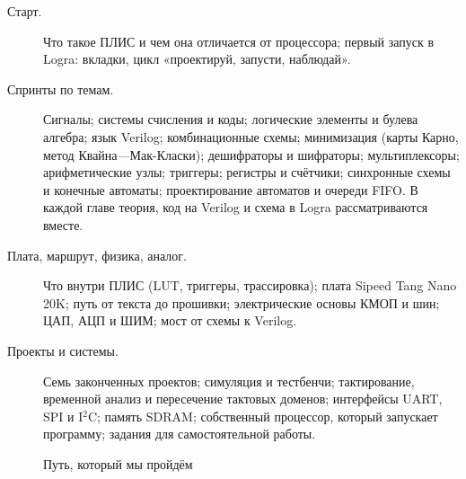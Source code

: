 \begin{description}
  \item[Старт.] Что такое ПЛИС и чем она отличается от процессора; первый
    запуск в Logra: вкладки, цикл «проектируй, запусти, наблюдай».
  \item[Спринты по темам.] Сигналы; системы счисления и коды; логические
    элементы и булева алгебра; язык Verilog; комбинационные схемы;
    минимизация (карты Карно, метод Квайна---Мак-Класки); дешифраторы и
    шифраторы; мультиплексоры; арифметические узлы; триггеры; регистры и
    счётчики; синхронные схемы и конечные автоматы; проектирование автоматов и
    очереди FIFO. В каждой главе теория, код на Verilog и схема в Logra
    рассматриваются вместе.
  \item[Плата, маршрут, физика, аналог.] Что внутри ПЛИС (LUT, триггеры,
    трассировка); плата Sipeed Tang Nano 20K; путь от текста до прошивки;
    электрические основы КМОП и шин; ЦАП, АЦП и ШИМ; мост от схемы к Verilog.
  \item[Проекты и системы.] Семь законченных проектов; симуляция и
    тестбенчи; тактирование, временной анализ и пересечение тактовых доменов;
    интерфейсы UART, SPI и I$^2$C; память SDRAM; собственный процессор,
    который запускает программу; задания для самостоятельной работы.
\end{description}

\begin{figure}[H]
\centering
{}
\caption{Путь, который мы пройдём}
\end{figure}

